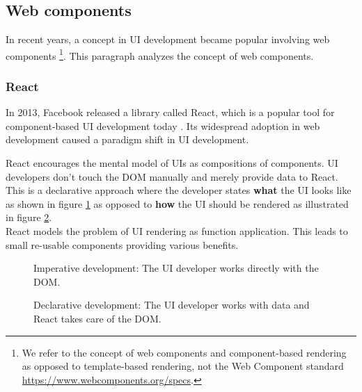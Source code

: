 \subsection{Web components}\label{webcomponents}
In recent years, a concept in UI development became popular involving web components \footnote{We refer to the concept of web components and component-based rendering as opposed to template-based rendering, not the Web Component standard \url{https://www.webcomponents.org/specs}.}. This paragraph analyzes the concept of web components.

\subsubsection{React}\label{sec:react}
In 2013, Facebook released a library called React, which is a popular tool for component-based UI development today \citep{reactmarketshare}. Its widespread adoption in web development caused a paradigm shift in UI development.

React encourages the mental model of UIs as compositions of components. UI developers don't touch the DOM manually and merely provide data to React. This is a declarative approach where the developer states \textbf{what} the UI looks like as shown in figure \ref{fig:imperative} as opposed to \textbf{how} the UI should be rendered as illustrated in figure \ref{fig:declarative}. \\
React models the problem of UI rendering as function application. This leads to small re-usable components providing various benefits.

\begin{figure}[!htb]
  \caption{Imperative development: The UI developer works directly with the DOM.}
  \label{fig:imperative}
\end{figure}

\begin{figure}[!htb]
  \caption{Declarative development: The UI developer works with data and React takes care of the DOM.}
  \label{fig:declarative}
\end{figure}

